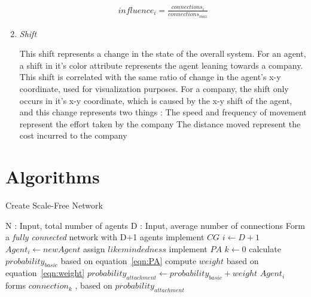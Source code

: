 \begin{enumerate}
\begin{eqnarray}
influence_{i} = \frac{connections_i}{connections_{max}} 
\label{eqn:influence} 
\end{eqnarray}

\item \emph{Shift}

This shift represents a change in the state of the overall system. For an agent, a shift in it's color attribute represents the agent leaning towards a company. This shift is correlated with the same ratio of change in the agent's x-y coordinate, used for visualization purposes.
For a company, the shift only occurs in it's x-y coordinate, which is caused by the x-y shift of the agent, and this change represents two things : 
\subitem[a] The speed and frequency of movement represent the effort taken by the company
\subitem[b] The distance moved represent the cost incurred to the company
\end{enumerate}

\clearpage

\section{Algorithms}

\begin{algorithm}
\caption{Create Scale-Free Network}
\label{alg1}
\begin{algorithmic}
\STATE N : Input, total number of agents
\STATE D : Input, average number of connections
	\STATE Form a \emph{fully connected} network with D+1 agents
\ENDIF 
\STATE implement $CG$
\STATE $i \gets D+1$
	\STATE $Agent_i \gets newAgent$
	\STATE assign $likemindedness$ 
	\STATE implement $PA$
	\STATE $k \gets 0$
		\STATE calculate $probability_{basic}$ based on equation~\ref{eqn:PA}
		\STATE compute $weight$ based on equation~\ref{eqn:weight} 
		\STATE $probability_{attachment} \gets  probability_{basic} + weight$ 
		\STATE $Agent_i$ forms $connection_k$ , based on $probability_{attachment}$
	\ENDWHILE	
\ENDWHILE
\end{algorithmic}
\end{algorithm}

\clearpage

